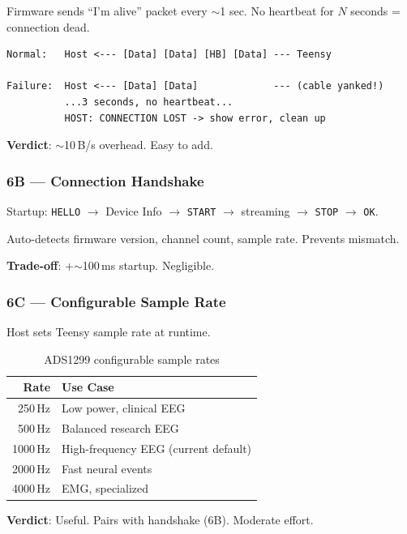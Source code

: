 \documentclass[11pt,a4paper]{article}
\begin{document}
Firmware sends ``I'm alive'' packet every ${\sim}$1 sec. No heartbeat for $N$ seconds = connection dead.

\begin{lstlisting}[style=diagram, caption={Heartbeat disconnect detection}]
Normal:   Host <--- [Data] [Data] [HB] [Data] --- Teensy

Failure:  Host <--- [Data] [Data]             --- (cable yanked!)
          ...3 seconds, no heartbeat...
          HOST: CONNECTION LOST -> show error, clean up
\end{lstlisting}

\textbf{Verdict}: ${\sim}$10\,B/s overhead. Easy to add.

\subsubsection{6B --- Connection Handshake}

Startup: \texttt{HELLO} $\to$ Device Info $\to$ \texttt{START} $\to$ streaming $\to$ \texttt{STOP} $\to$ \texttt{OK}.

Auto-detects firmware version, channel count, sample rate. Prevents mismatch.

\textbf{Trade-off}: +${\sim}$100\,ms startup. Negligible.

\subsubsection{6C --- Configurable Sample Rate}

Host sets Teensy sample rate at runtime.

\begin{table}[H]
\centering
\begin{tabular}{|r|l|}
\hline
\textbf{Rate} & \textbf{Use Case} \\\hline
\hline
250\,Hz & Low power, clinical EEG \\
500\,Hz & Balanced research EEG \\
1000\,Hz & High-frequency EEG (current default) \\
2000\,Hz & Fast neural events \\
4000\,Hz & EMG, specialized \\
\hline
\end{tabular}
\caption{ADS1299 configurable sample rates}
\end{table}

\textbf{Verdict}: Useful. Pairs with handshake (6B). Moderate effort.
\end{document}
